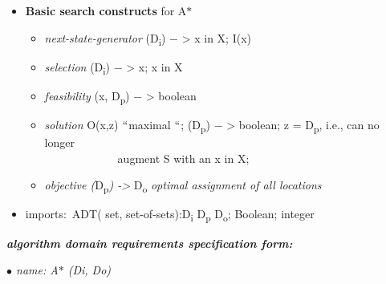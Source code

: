 \documentclass[12pt]{article}
\renewcommand{\_}{\kern-1.5pt\textunderscore\kern-1.5pt}
\begin{document}
\begin{itemize}
	\item \textbf{Basic search constructs} for A$\ast$ \par

 \par

\begin{itemize}
	\item \textit{next-state-generator} (D\textsubscript{i}) $-$  > x in X; I(x) \par

	\item \textit{selection} (D\textsubscript{i}) $-$  > x; x in X \par

	\item \textit{feasibility} (x, D\textsubscript{p}) $-$  > boolean\par

	\item \textit{solution} O(x,z) $``$maximal $``$; (D\textsubscript{p}) $-$  > boolean; z = D\textsubscript{p}, i.e., can no longer \\
\ \ \ \ \ \ \ \ \ \ \ \ \  augment S with an x in X; \par

	\item \textit{objective (}D\textsubscript{p}\textit{) -> }D\textsubscript{o }\textit{optimal assignment of all locations}
\end{itemize}\par

	\item imports:\  ADT( set, set-of-sets):D\textsubscript{i} D\textsubscript{p }D\textsubscript{o}; Boolean; integer
\end{itemize}\par


\vspace{\baselineskip}
\setlength{\parskip}{0.0pt}
\begin{adjustwidth}{0.0in}{-0.01in}
\textbf{\textit{algorithm domain requirements speciﬁcation form:}}\par

\end{adjustwidth}

\begin{adjustwidth}{0.0in}{-0.01in}
\textit{$\bullet$  name:  A$\ast$   (Di,  Do)}\par

\end{adjustwidth}
\end{document}
